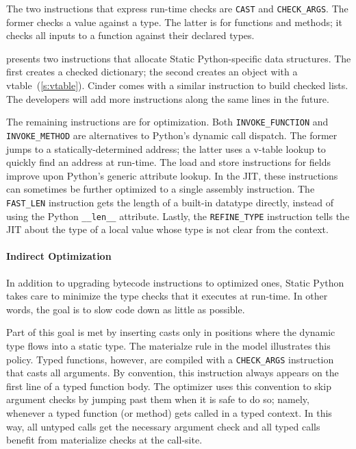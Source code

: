 \documentclass[english,cleveref,submission]{programming}
\newcommand{\SP}{Static Python}
\newcommand{\code}[1]{\texttt{#1}}
\newcommand{\bcinst}[1]{\code{#1}}
\begin{document}
The two instructions that express run-time checks are \code{CAST}
and \code{CHECK\_ARGS}.
The former checks a value against a type.
The latter is for functions and methods; it checks all inputs to a function
against their declared types.

 presents two instructions that allocate \SP{}-specific data structures.
The first creates a checked dictionary; the second creates an object with a vtable~(\cref{s:vtable}).
Cinder comes with a similar instruction to build checked lists.
The developers will add more instructions along the same lines in the future.

The remaining instructions are for optimization.
Both \bcinst{INVOKE\_FUNCTION} and \bcinst{INVOKE\_METHOD} are alternatives
to Python's dynamic call dispatch.
The former jumps to a statically-determined address;
the latter uses a v-table lookup to quickly find an address at run-time.
The load and store instructions for fields improve upon Python's generic attribute lookup.
In the JIT, these instructions can sometimes be further optimized to a single assembly instruction.
The \bcinst{FAST\_LEN} instruction gets the length of a built-in datatype directly, instead
of using the Python \code{\_\_len\_\_} attribute.
Lastly, the \bcinst{REFINE\_TYPE} instruction tells the JIT about the type of a local value whose
type is not clear from the context.


\paragraph{Indirect Optimization}

In addition to upgrading bytecode instructions to optimized ones, \SP{} takes care
to minimize the type checks that it executes at run-time.
In other words, the goal is to slow code down as little as possible.

Part of this goal is met by inserting casts only in positions where the dynamic
type flows into a static type.
The materialze rule in the model illustrates this policy.
Typed functions, however, are compiled with a \bcinst{CHECK\_ARGS} instruction
that casts all arguments.
By convention, this instruction always appears on the first line of a typed
function body.
The optimizer uses this convention to skip argument checks by jumping past them
when it is safe to do so; namely, whenever a typed function (or method) gets
called in a typed context.
In this way, all untyped calls get the necessary argument check and all typed
calls benefit from materialize checks at the call-site.
\end{document}
